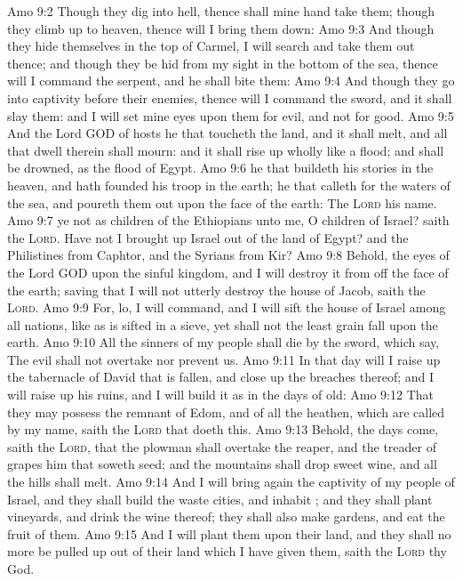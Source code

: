 \vs Amo 9:2 Though they dig into hell, thence shall mine hand take them; though they climb up to heaven, thence will I bring them down:
\vs Amo 9:3 And though they hide themselves in the top of Carmel, I will search and take them out thence; and though they be hid from my sight in the bottom of the sea, thence will I command the serpent, and he shall bite them:
\vs Amo 9:4 And though they go into captivity before their enemies, thence will I command the sword, and it shall slay them: and I will set mine eyes upon them for evil, and not for good.
\vs Amo 9:5 And the Lord GOD of hosts  he that toucheth the land, and it shall melt, and all that dwell therein shall mourn: and it shall rise up wholly like a flood; and shall be drowned, as  the flood of Egypt.
\vs Amo 9:6  he that buildeth his stories in the heaven, and hath founded his troop in the earth; he that calleth for the waters of the sea, and poureth them out upon the face of the earth: The \textsc{Lord}  his name.
\vs Amo 9:7  ye not as children of the Ethiopians unto me, O children of Israel? saith the \textsc{Lord}. Have not I brought up Israel out of the land of Egypt? and the Philistines from Caphtor, and the Syrians from Kir?
\vs Amo 9:8 Behold, the eyes of the Lord GOD  upon the sinful kingdom, and I will destroy it from off the face of the earth; saving that I will not utterly destroy the house of Jacob, saith the \textsc{Lord}.
\vs Amo 9:9 For, lo, I will command, and I will sift the house of Israel among all nations, like as  is sifted in a sieve, yet shall not the least grain fall upon the earth.
\vs Amo 9:10 All the sinners of my people shall die by the sword, which say, The evil shall not overtake nor prevent us.
\vs Amo 9:11 In that day will I raise up the tabernacle of David that is fallen, and close up the breaches thereof; and I will raise up his ruins, and I will build it as in the days of old:
\vs Amo 9:12 That they may possess the remnant of Edom, and of all the heathen, which are called by my name, saith the \textsc{Lord} that doeth this.
\vs Amo 9:13 Behold, the days come, saith the \textsc{Lord}, that the plowman shall overtake the reaper, and the treader of grapes him that soweth seed; and the mountains shall drop sweet wine, and all the hills shall melt.
\vs Amo 9:14 And I will bring again the captivity of my people of Israel, and they shall build the waste cities, and inhabit ; and they shall plant vineyards, and drink the wine thereof; they shall also make gardens, and eat the fruit of them.
\vs Amo 9:15 And I will plant them upon their land, and they shall no more be pulled up out of their land which I have given them, saith the \textsc{Lord} thy God.
